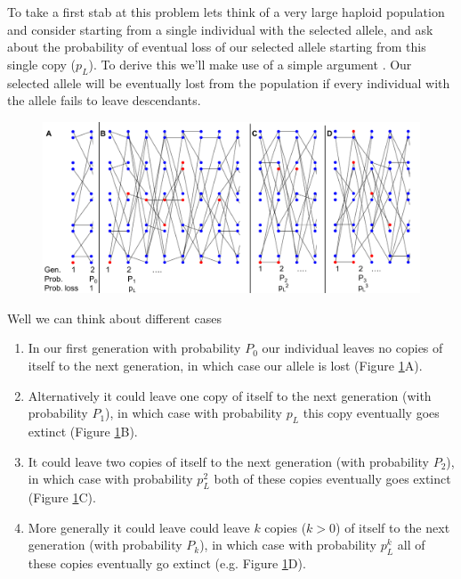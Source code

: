 To take a first stab at this problem lets think of a very large
haploid population and consider starting from a single individual with the selected allele, and ask
about the probability of eventual loss of our selected allele starting
from this single copy ($p_L$). To derive this we'll make use of a
simple argument \citep[derived from branching processes][]{fisher1923xxi,haldane1927mathematical}. Our selected
allele will be eventually lost from the population if every individual
with the allele fails to leave descendants.
\begin{figure}
\begin{center}
\includegraphics[width=\textwidth]{figures/Proof_of_pL_2s.pdf}
\end{center}
\caption{} \label{fig:Proof_of_pL_2s}
\end{figure}
Well we can think about different cases 
\begin{enumerate}
\item In our first generation
with probability $P_0$ our individual leaves no copies of itself to
the next generation, in which case our allele is lost (Figure \ref{fig:Proof_of_pL_2s}A).
\item Alternatively
it could leave one copy of itself to the next generation (with
probability $P_1$), in which
case with probability $p_L$ this copy eventually goes extinct (Figure \ref{fig:Proof_of_pL_2s}B).
\item It could leave two copies of itself to the next generation (with
probability $P_2$), in which
case with probability $p_L^2$ both of these copies eventually goes
extinct (Figure \ref{fig:Proof_of_pL_2s}C).
\item More generally it could leave could leave $k$ copies ($k>0$) of itself to the next generation (with
probability $P_k$), in which case with probability $p_L^k$  all of
these copies eventually go extinct (e.g. Figure \ref{fig:Proof_of_pL_2s}D).
\end{enumerate}
